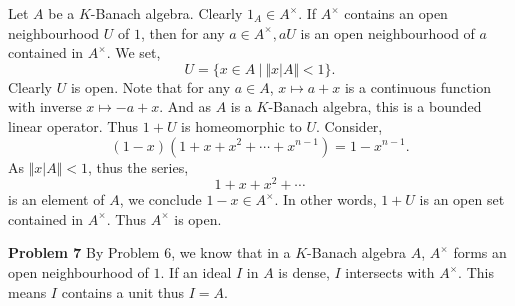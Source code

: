 \documentclass[10pt]{article}
\newcommand{\norm}[1]{\Vert #1 \Vert}
\newcommand{\sep}[0]{\:|\:}
\begin{document}
Let $A$ be a $K$-Banach algebra. Clearly $1_A\in A^\times$. If $A^\times$ contains an open neighbourhood $U$ of $1$, then for any $a\in A^\times, aU$ is an open neighbourhood of $a$ contained in $A^\times$. We set,
\begin{equation*}
  U = \{x\in A\sep \norm{x|A}<1\}.
\end{equation*}
Clearly $U$ is open. Note that for any $a\in A$, $x\mapsto a+x$ is a continuous function with inverse $x\mapsto -a+x$. And as $A$ is a $K$-Banach algebra, this is a bounded linear operator. Thus $1+U$ is homeomorphic to $U$.
Consider,
\begin{equation*}
  (1-x)(1+x+x^2+\cdots+x^{n-1}) = 1-x^{n-1}.
\end{equation*}
As $\norm{x|A}<1$, thus the series, 
\begin{equation*}
  1+x+x^2+\cdots
\end{equation*}
is an element of $A$, we conclude $1-x\in A^\times$. In other words, $1+U$ is an open set contained in $A^\times$. Thus $A^\times$ is open.
\\\par\textbf{Problem 7}
By Problem 6, we know that in a $K$-Banach algebra $A$, $A^\times$ forms an open neighbourhood of $1$. If an ideal $I$ in $A$ is dense, $I$ intersects with $A^\times$. This means $I$ contains a unit thus $I=A$.
\end{document}
